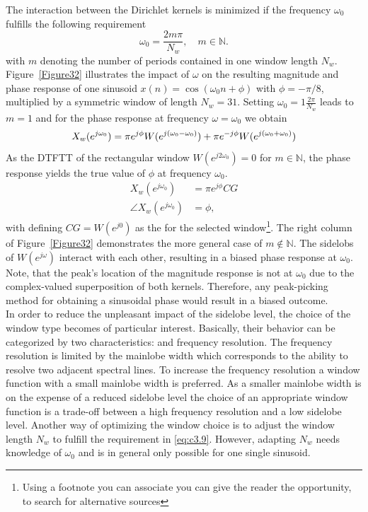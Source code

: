 \noindent The interaction between the Dirichlet kernels is minimized if the frequency $\omega_0$ fulfills the following requirement
\begin{equation}\label{eq:c3.9}
	\omega_0=\frac{2{m}\pi}{N_w}, \quad m\in\mathbb{N}.
\end{equation}
with $m$ denoting the number of periods contained in one window length $N_w$. Figure~\ref{Figure32} illustrates the impact of $\omega$ on the resulting magnitude and phase response of one sinusoid $x(n)=\cos(\omega_0 n+\phi)$ with $\phi=-\pi/8$, multiplied by a symmetric window of length $N_w=31$. Setting $\omega_0=1\frac{2\pi}{N_w}$ leads to $m=1$ and for the phase response at frequency $\omega=\omega_0$ we obtain
\begin{equation}
	X_w(e^{j\omega_0})=\pi e^{j\phi}W(e^{j(\omega_0-\omega_0)})+\pi e^{-j\phi}W(e^{j(\omega_0+\omega_0)})\\
\end{equation}
As the \gls{DTFT}T of the rectangular window $W(e^{j2\omega_0})=0$ for $m\in\mathbb{N}$, the phase response yields the true value of $\phi$ at frequency $\omega_0$.
\begin{align}\label{eq:c3.10}
	X_w(e^{j\omega_0})&=\pi e^{j\phi} CG\\
	\angle X_w(e^{j\omega_0})&=\phi,
\end{align}
with defining $CG=W(e^{j0})$ as the  for the selected window\footnote{Using a footnote you can associate you can give the reader the opportunity, to search for alternative sources}. The right column of Figure~\ref{Figure32} demonstrates the more general case of $m\notin\mathbb{N}$. The sidelobs of $W(e^{j\omega})$ interact with each other, resulting in a biased phase response at $\omega_0$. Note, that the peak's location of the magnitude response is not at $\omega_0$ due to the complex-valued superposition of both kernels. Therefore, any peak-picking method for obtaining a sinusoidal phase would result in a biased outcome.\\

\noindent In order to reduce the unpleasant impact of the sidelobe level, the choice of the window type becomes of particular interest. Basically, their behavior can be categorized by two characteristics:  and {frequency resolution}. The frequency resolution is limited by the mainlobe width which corresponds to the ability to resolve two adjacent spectral lines. To increase the frequency resolution a window function with a small mainlobe width is preferred. As a smaller mainlobe width is on the expense of a reduced sidelobe level the choice of an appropriate window function is a trade-off between a high frequency resolution and a low sidelobe level. Another way of optimizing the window choice is to adjust the window length $N_w$ to fulfill the requirement in \eqref{eq:c3.9}. However, adapting $N_w$ needs knowledge of $\omega_0$ and is in general only possible for one single sinusoid. \\

